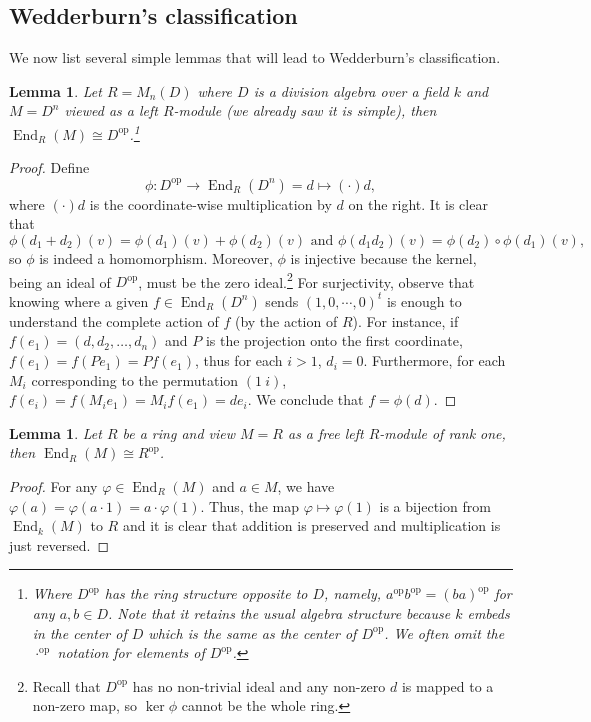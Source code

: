 \documentclass{tufte-handout} %
\newtheorem{lem}[thm]{Lemma}
\theoremstyle{definition}
\theoremstyle{remark}
\newcommand{\op}[1]{#1^{\text{op}}}
\DeclareMathOperator{\End}{End}
\begin{document}
\subsection{Wedderburn's classification}
We now list several simple lemmas that will lead to Wedderburn's classification.
\begin{lem}
	Let $R = M_n(D)$ where $D$ is a division algebra over a field $k$ and $M = D^n$ viewed as a left $R$-module (we already saw it is simple), then $\End_R(M) \cong \op{D}$.\footnote{Where $\op{D}$ has the ring structure opposite to $D$, namely, $\op{a}\op{b} = \op{(ba)}$ for any $a, b \in D$. Note that it retains the usual algebra structure because $k$ embeds in the center of $D$ which is the same as the center of $\op{D}$. We often omit the $\op{\cdot}$ notation for elements of $\op{D}$.}
\end{lem}
\begin{proof}
	Define \[\phi: \op{D} \rightarrow \End_R(D^n) = d \mapsto (\cdot)d,\] where $(\cdot)d$ is the coordinate-wise multiplication by $d$ on the right. It is clear that \[\phi(d_1+d_2)(v) = \phi(d_1)(v) + \phi(d_2)(v) \text{ and } \phi(d_1d_2)(v) = \phi(d_2)\circ \phi(d_1)(v),\] so $\phi$ is indeed a homomorphism. Moreover, $\phi$ is injective because the kernel, being an ideal of $\op{D}$, must be the zero ideal.\footnote{Recall that $\op{D}$ has no non-trivial ideal and any non-zero $d$ is mapped to a non-zero map, so $\ker \phi$ cannot be the whole ring.} For surjectivity, observe that knowing where a given $f \in \End_R(D^n)$ sends $(1,0,\cdots ,0)^t$ is enough to understand the complete action of $f$ (by the action of $R$). For instance, if $f(e_1) = (d, d_2, \dots, d_n)$ and $P$ is the projection onto the first coordinate, $f(e_1) = f(Pe_1) = Pf(e_1)$, thus for each $i > 1$, $d_i = 0$. Furthermore, for each $M_i$ corresponding to the permutation $(1\ i)$, $f(e_i) = f(M_ie_1) = M_if(e_1) = de_i$. We conclude that $f = \phi(d)$. 
\end{proof}
\begin{lem}\label{lem1wedd}
	Let $R$ be a ring and view $M=R$ as a free left $R$-module of rank one, then $\End_R(M) \cong \op{R}$.
\end{lem}
\begin{proof}
	For any $\varphi \in \End_R(M)$ and $a \in M$, we have $\varphi(a) = \varphi(a\cdot1) = a\cdot \varphi(1)$. Thus, the map $\varphi \mapsto \varphi(1)$ is a bijection from $\End_k(M)$ to $R$ and it is clear that addition is preserved and multiplication is just reversed.
\end{proof}
\end{document}
